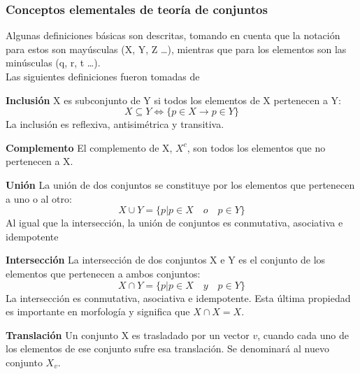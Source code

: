 \subsubsection{Conceptos elementales de teoría de conjuntos}
Algunas definiciones básicas son descritas, tomando en cuenta que la notación para estos son mayúsculas (X, Y, Z \dots), mientras
que para los elementos son las minúsculas (q, r, t \dots).\\
Las siguientes definiciones fueron tomadas de \cite{10045_10053}
\theoremstyle{definition}
\begin{definition}{\textbf{Inclusión}}
    X es subconjunto de Y si todos los elementos de X pertenecen a Y: 
    \begin{equation}
        X \subseteq Y 	\iff \{ p \in X \rightarrow p \in Y \}
    \end{equation}
    La inclusión es reflexiva, antisimétrica y transitiva. 
\end{definition}
\begin{definition}{\textbf{Complemento}}
    El complemento de X, $X^c$, son todos los elementos que no pertenecen a X.
\end{definition}
\begin{definition}{\textbf{Unión}}
    La unión de dos conjuntos se constituye por los elementos que pertenecen a uno o al otro: 
    \begin{equation}
        X \cup Y = \{ p|p \in X \quad o  \quad p \in Y \}  
    \end{equation}
    Al igual que la intersección, la unión de conjuntos es conmutativa, asociativa e idempotente
\end{definition}
\begin{definition}{\textbf{Intersección}}
    La intersección de dos conjuntos X e Y es el conjunto de los elementos que pertenecen a ambos conjuntos:
    \begin{equation}
        X \cap Y = \{ p|p \in X \quad y \quad p \in Y \}
    \end{equation}
    La intersección es conmutativa, asociativa e idempotente. Esta última propiedad es importante en morfología y 
    significa que $X \cap X = X$. 
\end{definition}
\begin{definition}{\textbf{Translación}}
    Un conjunto X es trasladado por un vector $v$, cuando cada uno de los elementos de ese conjunto sufre esa translación. 
    Se denominará al nuevo conjunto $X_v$.
\end{definition}

